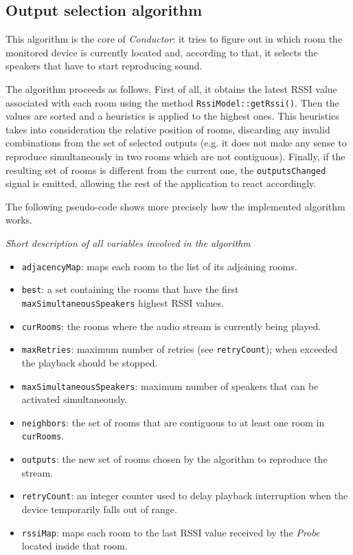 \documentclass[conference]{IEEEtran}
\newcommand{\Conductor}{\textsl{Conductor}}
\newcommand{\Probe}{\textsl{Probe}}
\begin{document}
\subsection{Output selection algorithm}
\label{algo}
This algorithm is the core of \Conductor{}: it tries to figure out in which room the monitored device is currently located and, according to that, it selects the speakers that have to start reproducing sound.

The algorithm proceeds as follows. First of all, it obtains the latest RSSI value associated with each room using the method \texttt{RssiModel::getRssi()}. Then the values are sorted and a heuristics is applied to the highest ones. This heuristics takes into consideration the relative position of rooms, discarding any invalid combinations from the set of selected outputs (e.g. it does not make any sense to reproduce simultaneously in two rooms which are not contiguous). Finally, if the resulting set of rooms is different from the current one, the \texttt{outputsChanged} signal is emitted, allowing the rest of the application to react accordingly.

The following pseudo-code shows more precisely how the implemented algorithm works.

\vspace{2mm}
\textit{Short description of all variables involved in the algorithm}
\begin{itemize}
\item \texttt{adjacencyMap}: maps each room to the list of its adjoining rooms.
\item \texttt{best}: a set containing the rooms that have the first \texttt{maxSimultaneousSpeakers} highest RSSI values.
\item \texttt{curRooms}: the rooms where the audio stream is currently being played.
\item \texttt{maxRetries}: maximum number of retries (see \texttt{retryCount}); when exceeded the playback should be stopped.
\item \texttt{maxSimultaneousSpeakers}: maximum number of speakers that can be activated simultaneously.
\item \texttt{neighbors}: the set of rooms that are contiguous to at least one room in \texttt{curRooms}.
\item \texttt{outputs}: the new set of rooms chosen by the algorithm to reproduce the stream.
\item \texttt{retryCount}: an integer counter used to delay playback interruption when the device temporarily falls out of range.
\item \texttt{rssiMap}: maps each room to the last RSSI value received by the \Probe{} located inside that room.
\end{itemize}
\end{document}
